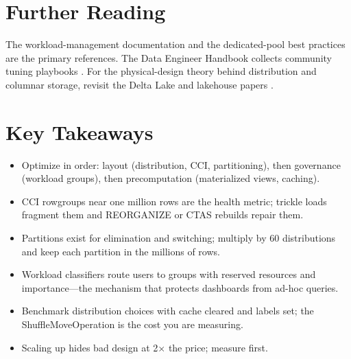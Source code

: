 \section{Further Reading}
The workload-management documentation \cite{microsoft2025synapseWorkloadMgmt} and the dedicated-pool best practices \cite{microsoft2025synapseDedicatedBest} are the primary references. The Data Engineer Handbook collects community tuning playbooks \cite{dataexpert2025handbook}. For the physical-design theory behind distribution and columnar storage, revisit the Delta Lake and lakehouse papers \cite{armbrust2020delta,armbrust2021lakehouse}.

\section*{Key Takeaways}
\begin{itemize}
    \item Optimize in order: layout (distribution, CCI, partitioning), then governance (workload groups), then precomputation (materialized views, caching).
    \item CCI rowgroups near one million rows are the health metric; trickle loads fragment them and REORGANIZE or CTAS rebuilds repair them.
    \item Partitions exist for elimination and switching; multiply by 60 distributions and keep each partition in the millions of rows.
    \item Workload classifiers route users to groups with reserved resources and importance---the mechanism that protects dashboards from ad-hoc queries.
    \item Benchmark distribution choices with cache cleared and labels set; the ShuffleMoveOperation is the cost you are measuring.
    \item Scaling up hides bad design at 2$\times$ the price; measure first.
\end{itemize}


